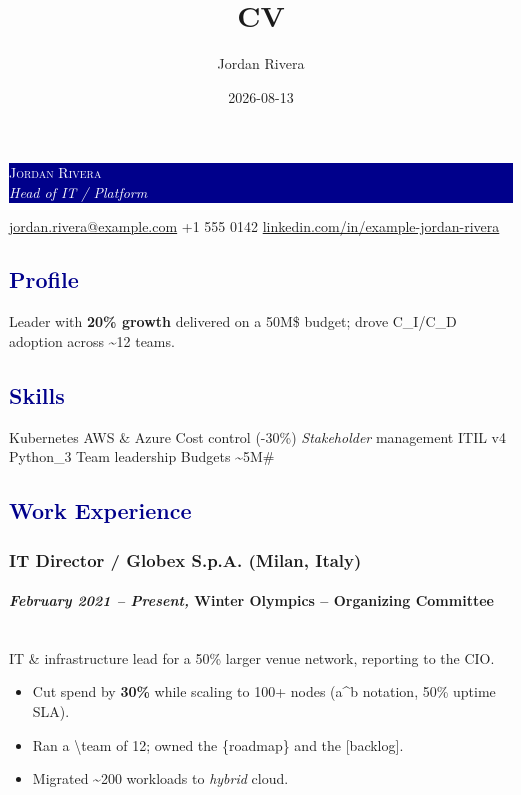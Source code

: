 \documentclass[a4paper]{article}
\title{CV}
\author{Jordan Rivera}
\date{2026-08-13}
\newcommand\textstyleStrongEmphasis[1]{\textbf{#1}}
\newcommand\textstyleEmphasis[1]{\textit{#1}}
\newcommand\liststyleListi{%
\renewcommand\labelitemi{{\textbullet}}
\renewcommand\labelitemii{{\textbullet}}
\renewcommand\labelitemiii{{\textbullet}}
\renewcommand\labelitemiv{{\textbullet}}
}
\begin{document}
\noindent
\colorbox{darkblue}{\parbox{\dimexpr\linewidth-2\fboxsep}{%
  \textcolor{white}{\Large\scshape Jordan Rivera}\\[2pt]
  \textcolor{white}{\large\itshape Head of IT / Platform}}}



\begin{center}
  \textcolor{darkblue}{\faEnvelope}\hspace{0.35em}\href{mailto:jordan.rivera@example.com}{jordan.rivera@example.com}\quad
  \textcolor{darkblue}{\faPhone}\hspace{0.35em}+1 555 0142\quad
  \textcolor{darkblue}{\faLinkedin}\hspace{0.35em}\href{https://www.linkedin.com/in/example-jordan-rivera}{linkedin.com/in/example-jordan-rivera}
\end{center}
\textcolor{darkblue}{\subsection{Profile}}
{Leader with \textbf{20\% growth} delivered on a 50M\$ budget; drove C\_I/C\_D adoption across \textasciitilde{}12 teams.}

\textcolor{darkblue}{\subsection{Skills}}
\noindent
{Kubernetes {\textbullet} AWS \& Azure {\textbullet} Cost control (-30\%) {\textbullet} \textit{Stakeholder} management {\textbullet} ITIL v4 {\textbullet} Python\_3 {\textbullet} Team leadership {\textbullet} Budgets \textasciitilde{}5M\#}

\textcolor{darkblue}{\subsection{Work Experience}}
\subsubsection[IT Director / Globex S.p.A. (Milan, Italy)]{\textstyleStrongEmphasis{IT Director / Globex S.p.A.} \textmd{(Milan, Italy)}}
\paragraph[February 2021 {}-- Present, Winter Olympics {}-- Organizing Committee]{\textstyleEmphasis{February 2021 {}-- Present, }\textstyleStrongEmphasis{Winter Olympics {}-- Organizing Committee}}
\mbox{}\\
IT \& infrastructure lead for a 50\% larger venue network, reporting to the CIO.
\liststyleListi
\begin{itemize}\setlength\itemsep{0pt}\setlength\parsep{3pt}
\item {Cut spend by \textbf{30\%} while scaling to 100+ nodes (a\textasciicircum{}b notation, 50\% uptime SLA).}
\item {Ran a \textbackslash{}team of 12; owned the \{roadmap\} and the {[}backlog{]}.}
\item {Migrated \textasciitilde{}200 workloads to \textit{hybrid} cloud.}
\end{itemize}
\end{document}
